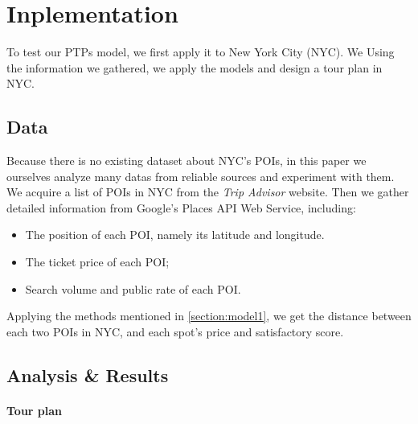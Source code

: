 \documentclass{mcmthesis}
\begin{document}
\section{Inplementation}
  To test our PTPs model, we first apply it to New York City (NYC). We Using the information we gathered, we apply the models and design a tour plan in NYC.
\subsection{Data}
  Because there is no existing dataset about NYC's POIs, in this paper we ourselves analyze many datas from reliable sources and experiment with them. We acquire a list of POIs in NYC from the \emph{Trip Advisor} website\cite{TripAdv}. Then we gather detailed information from Google's Places API Web Service\cite{GMaps}, including:
  \begin{itemize}
    \item The position of each POI, namely its latitude and longitude.
    \item The ticket price of each POI;
    \item Search volume and public rate of each POI.
  \end{itemize}
  Applying the methods mentioned in \ref{section:model1}, we get the distance between each two POIs in NYC, and each spot's price and satisfactory score. 
\subsection{Analysis \& Results}
  \paragraph{Tour plan} \
\end{document}
